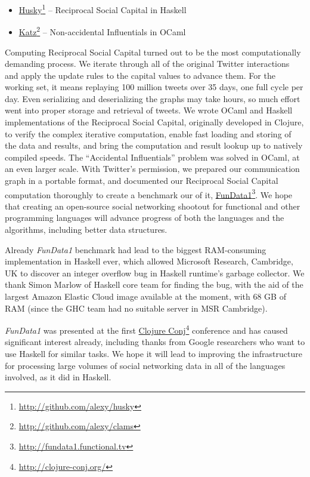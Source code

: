 \documentclass[10pt,oneside]{memoir}
\begin{document}
\begin{Spacing}{2}
\begin{itemize}
\item \href{http://github.com/alexy/husky}{Husky}\footnote{\href{http://github.com/alexy/husky}{http://github.com/alexy/husky}} -- Reciprocal Social Capital in Haskell

\item \href{http://github.com/alexy/clams}{Katz}\footnote{\href{http://github.com/alexy/clams}{http://github.com/alexy/clams}} -- Non-accidental Influentials in OCaml
\end{itemize}

Computing Reciprocal Social Capital turned out to be the most computationally demanding process.  We iterate through all of the original Twitter interactions and apply the update rules to the capital values to advance them.  For the working set, it means replaying 100 million tweets over 35 days, one full cycle per day.  Even serializing and deserializing the graphs may take hours, so much effort went into proper storage and retrieval of tweets.  We wrote OCaml and Haskell implementations of the Reciprocal Social Capital, originally developed in Clojure, to verify the complex iterative computation, enable fast loading and storing of the data and results, and bring the computation and result lookup up to natively compiled speeds.  The ``Accidental Influentials'' problem was solved in OCaml, at an even larger scale.  With Twitter's permission, we prepared our communication graph in a portable format, and documented our Reciprocal Social Capital computation thoroughly to create a benchmark our of it, \href{http://fundata1.functional.tv}{FunData1}\footnote{\href{http://fundata1.functional.tv}{http://fundata1.functional.tv}}.  We hope that creating an open-source social networking shootout for functional and other programming languages will advance progress of both the languages and the algorithms, including better data structures.


Already {\itshape FunData1} benchmark had lead to the biggest RAM-consuming implementation in Haskell ever, which allowed Microsoft Research, Cambridge, UK to discover an integer overflow bug in Haskell runtime's garbage collector.  We thank Simon Marlow of Haskell core team for finding the bug, with the aid of the largest Amazon Elastic Cloud image available at the moment, with 68 GB of RAM (since the GHC team had no suitable server in MSR Cambridge).


{\itshape FunData1} was presented at the first \href{http://clojure-conj.org/}{Clojure Conj}\footnote{\href{http://clojure-conj.org/}{http://clojure-conj.org/}} conference and has caused significant interest already, including thanks from Google researchers who want to use Haskell for similar tasks.  We hope it will lead to improving the infrastructure for processing large volumes of social networking data in all of the languages involved, as it did in Haskell.



\end{Spacing}
\end{document}
